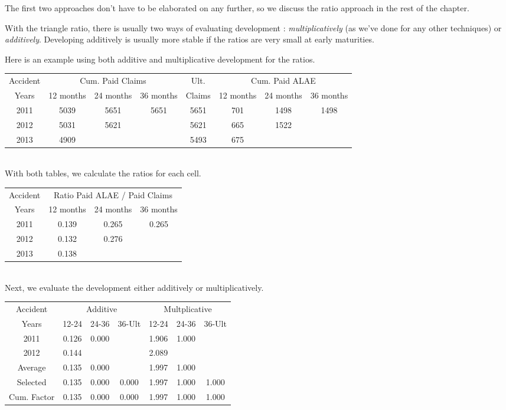 \documentclass[11pt, english]{memoir}
\numberwithin{definition}{section}
\begin{document}
The first two approaches don't have to be elaborated on any further, so we discuss the ratio approach in the rest of the chapter. 
	
With the triangle ratio, there is usually two ways of evaluating development : \emph{multiplicatively} (as we've done for any other techniques) or \emph{additively}. Developing additively is usually more stable if the ratios are very small at early maturities. 
	
Here is an example using both additive and multiplicative development for the ratios. 

\begin{tabularx}{\textwidth}{c|cccc|ccc}
	Accident & \multicolumn{3}{c}{Cum. Paid Claims} & Ult. &  \multicolumn{3}{c}{Cum. Paid ALAE}\\
	Years & 12 months & 24 months  & 36 months  & Claims &  12 months  & 24 months  & 36 months   \\
	\midrule
	2011 & 5039 & 5651 & 5651 & 5651 &  701 & 1498 & 1498 \\
	2012 & 5031 & 5621 & & 5621 &  665 & 1522 & \\
	2013 & 4909 & &  & 5493 & 675 & & \\
\end{tabularx}\\

With both tables, we calculate the ratios for each cell.

\begin{tabularx}{0.51\textwidth}{c|ccc}
	Accident & \multicolumn{3}{c}{Ratio Paid ALAE / Paid Claims} \\
	Years & 12 months & 24 months  & 36 months   \\
	\midrule
	2011 & 0.139 & 0.265 & 0.265  \\
	2012 & 0.132 & 0.276 &  \\
	2013 & 0.138 & &  \\
\end{tabularx}\\
	
Next, we evaluate the development either additively or multiplicatively. 

\begin{tabularx}{0.651\textwidth}{c|ccc|ccc}
	Accident & \multicolumn{3}{c}{Additive}  &  \multicolumn{3}{c}{Multplicative}\\
	Years & 12-24 & 24-36 & 36-Ult   &  12-24 & 24-36 & 36-Ult   \\
	\midrule
	2011 & 0.126 & 0.000 &  &  1.906  & 1.000 &  \\
	2012 & 0.144 &  & & 2.089 &  & \\
	\midrule
	Average & 0.135 & 0.000 & & 1.997 & 1.000 & \\
	Selected & 0.135 & 0.000 & 0.000 & 1.997 & 1.000 & 1.000\\
	Cum. Factor & 0.135 & 0.000 & 0.000 & 1.997 & 1.000 & 1.000\\
\end{tabularx}\\
	
\end{document}
